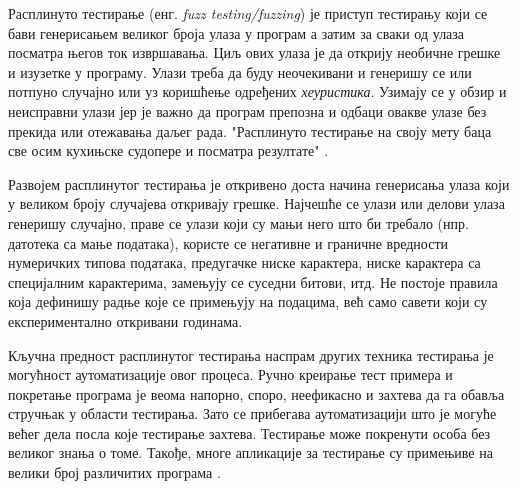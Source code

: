 \documentclass[12pt,oneside]{memoir}
\begin{document}
Расплинуто тестирање (енг. \textit{fuzz testing/fuzzing}) је приступ тестирању који се бави генерисањем великог броја улаза у програм а затим за сваки од улаза посматра његов  ток извршавања. Циљ ових улаза је да открију необичне грешке и изузетке у програму. Улази треба да буду неочекивани и генеришу се или потпуно случајно или уз коришћење одређених \textit{хеуристика}. Узимају се у обзир и неисправни улази јер је важно да програм препозна и одбаци овакве улазе без прекида или отежавања даљег рада. "Расплинуто тестирање на своју мету баца све осим кухињске судопере и посматра резултате" \cite{fuzzingBrute}. 

Развојем расплинутог тестирања је откривено доста начина генерисања улаза који у великом броју случајева откривају грешке. Најчешће се улази или делови улаза генеришу случајно, праве се улази који су мањи него што би требало (нпр. датотека са мање података), користе се негативне и граничне вредности нумеричких типова података, предугачке ниске карактера, ниске карактера са специјалним карактерима, замењују се суседни битови, итд. Не постоје правила која дефинишу радње које се примењују на подацима, већ само савети који су експериментално откривани годинама.  

Кључна предност расплинутог тестирања наспрам других техника тестирања је могућност аутоматизације овог процеса. Ручно креирање тест примера и покретање програма је веома напорно, споро, неефикасно и захтева да га обавља стручњак у области тестирања. Зато се прибегава аутоматизацији што је могуће већег дела посла које тестирање захтева. Тестирање може покренути особа без великог знања о томе. Такође, многе апликације за тестирање су примењиве на велики број различитих програма \cite{fuzzingBrute, fuzzing}.
\end{document}
